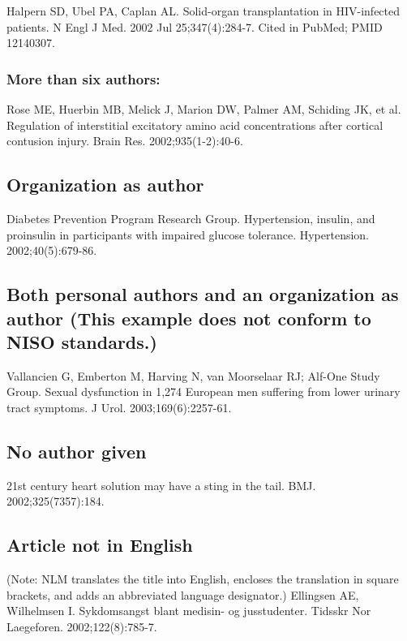 \documentclass[a4paper,10pt]{article}
\begin{document}
Halpern SD, Ubel PA, Caplan AL. Solid-organ transplantation in HIV-infected patients. N Engl J Med. 2002 Jul 25;347(4):284-7. Cited in PubMed; PMID 12140307.\cite{halpern.ubel.ea:solid-organ*1}

\subsubsection{More than six authors:}

Rose ME, Huerbin MB, Melick J, Marion DW, Palmer AM, Schiding JK, et al. Regulation of interstitial excitatory amino acid concentrations after cortical contusion injury. Brain Res. 2002;935(1-2):40-6.\cite{rose.huerbin.ea:regulation}

\subsection{Organization as author}

Diabetes Prevention Program Research Group. Hypertension, insulin, and proinsulin in participants with impaired glucose tolerance. Hypertension. 2002;40(5):679-86.\cite{hypertension}

\subsection{Both personal authors and an organization as author (This example does not conform to NISO standards.)}

Vallancien G, Emberton M, Harving N, van Moorselaar RJ; Alf-One Study Group. Sexual dysfunction in 1,274 European men suffering from lower urinary tract symptoms. J Urol. 2003;169(6):2257-61.\cite{vallancien.emberton.ea:sexual}

\subsection{No author given}

21st century heart solution may have a sting in the tail. BMJ. 2002;325(7357):184.\cite{21st}

\subsection{Article not in English}

(Note: NLM translates the title into English, encloses the translation in square brackets, and adds an abbreviated language designator.)
\linebreak 
Ellingsen AE, Wilhelmsen I. Sykdomsangst blant medisin- og jusstudenter. Tidsskr Nor Laegeforen. 2002;122(8):785-7.\cite{ellingsen.wilhelmsen:sykdomsangst}
\end{document}
